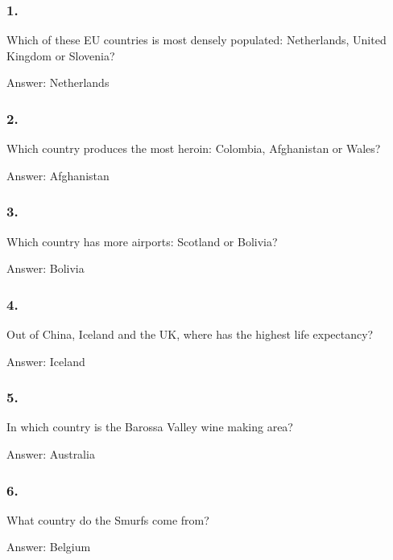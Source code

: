 \documentclass{beamer}
\begin{document}
    \begin{frame}
        \frametitle{1.}
        Which of these EU countries is most densely populated: Netherlands,
        United Kingdom or Slovenia?\\

        \begin{center}
            Answer: Netherlands
        \end{center}
    \end{frame}

    \begin{frame}
        \frametitle{2.}
        Which country produces the most heroin: Colombia, Afghanistan or
        Wales?\\

        \begin{center}
            Answer: Afghanistan
        \end{center}
    \end{frame}

    \begin{frame}
        \frametitle{3.}
        Which country has more airports: Scotland or Bolivia?\\

        \begin{center}
            Answer: Bolivia
        \end{center}
    \end{frame}

    \begin{frame}
        \frametitle{4.}
        Out of China, Iceland and the UK, where has the highest life
        expectancy?\\

        \begin{center}
            Answer: Iceland
        \end{center}
    \end{frame}

    \begin{frame}
        \frametitle{5.}
        In which country is the Barossa Valley wine making area?\\

        \begin{center}
            Answer: Australia
        \end{center}
    \end{frame}

    \begin{frame}
        \frametitle{6.}
        What country do the Smurfs come from?\\

        \begin{center}
            Answer: Belgium
        \end{center}
    \end{frame}
\end{document}
